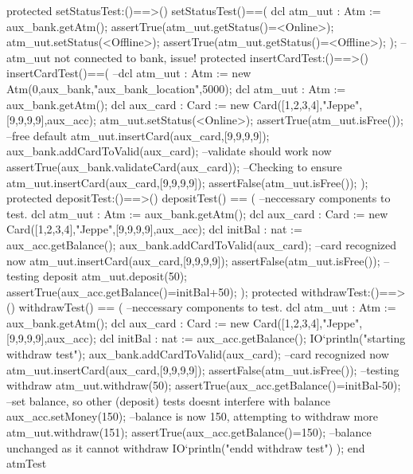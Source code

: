 \documentclass[a4paper]{article}
\begin{document}
\begin{vdm_al}
    protected setStatusTest:()==>()
    setStatusTest()==(
        dcl atm_uut : Atm := aux_bank.getAtm();
        assertTrue(atm_uut.getStatus()=<Online>);
        atm_uut.setStatus(<Offline>);
        assertTrue(atm_uut.getStatus()=<Offline>);
    );
    --atm_uut not connected to bank, issue! 
    protected insertCardTest:()==>()
    insertCardTest()==(
        --dcl atm_uut : Atm := new Atm(0,aux_bank,"aux_bank_location",5000); 
        dcl atm_uut : Atm := aux_bank.getAtm();
        dcl aux_card : Card := new Card([1,2,3,4],"Jeppe",[9,9,9,9],aux_acc);
        atm_uut.setStatus(<Online>);
        assertTrue(atm_uut.isFree()); --free default
        atm_uut.insertCard(aux_card,[9,9,9,9]); 
        aux_bank.addCardToValid(aux_card); --validate should work now
        assertTrue(aux_bank.validateCard(aux_card)); --Checking to ensure
        atm_uut.insertCard(aux_card,[9,9,9,9]);
        assertFalse(atm_uut.isFree()); 
    );
    protected depositTest:()==>()
    depositTest() == (
        --neccessary components to test.
        dcl atm_uut : Atm := aux_bank.getAtm();
        dcl aux_card : Card := new Card([1,2,3,4],"Jeppe",[9,9,9,9],aux_acc);
        dcl initBal : nat := aux_acc.getBalance();
        aux_bank.addCardToValid(aux_card); --card recognized now
        atm_uut.insertCard(aux_card,[9,9,9,9]);
        assertFalse(atm_uut.isFree());
        --testing deposit
        atm_uut.deposit(50);
        assertTrue(aux_acc.getBalance()=initBal+50);
    );
    protected withdrawTest:()==>()
    withdrawTest() == (
        --neccessary components to test.
        dcl atm_uut : Atm := aux_bank.getAtm();
        dcl aux_card : Card := new Card([1,2,3,4],"Jeppe",[9,9,9,9],aux_acc);
        dcl initBal : nat := aux_acc.getBalance();
        IO`println("starting withdraw test");
        aux_bank.addCardToValid(aux_card); --card recognized now
        atm_uut.insertCard(aux_card,[9,9,9,9]);
        assertFalse(atm_uut.isFree());
        --testing withdraw
        atm_uut.withdraw(50);
        assertTrue(aux_acc.getBalance()=initBal-50);
        --set balance, so other (deposit) tests doesnt interfere with balance
        aux_acc.setMoney(150);
        --balance is now 150, attempting to withdraw more
        atm_uut.withdraw(151);
        assertTrue(aux_acc.getBalance()=150); --balance unchanged as it cannot withdraw
        IO`println("endd withdraw test")
    );
end atmTest
\end{vdm_al}
\bigskip
\end{document}
